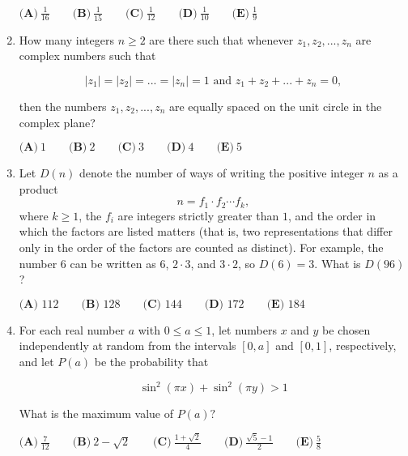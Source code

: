\documentclass{article}
\begin{document}
\begin{enumerate}[label=\arabic*., itemsep=0.5em]
\(\textbf{(A)}\ \frac{1}{16} \qquad\textbf{(B)}\ \frac{1}{15} \qquad\textbf{(C)}\ \frac{1}{12} \qquad\textbf{(D)}\ \frac{1}{10} \qquad\textbf{(E)}\ \frac{1}{9}\)\par \vspace{0.5em}\item How many integers \(n \geq 2\) are there such that whenever \(z_1, z_2, ..., z_n\) are complex numbers such that


\begin{equation*}
|z_1| = |z_2| = ... = |z_n| = 1 \text{    and    } z_1 + z_2 + ... + z_n = 0,
\end{equation*}

then the numbers \(z_1, z_2, ..., z_n\) are equally spaced on the unit circle in the complex plane?

\(\textbf{(A)}\ 1 \qquad\textbf{(B)}\ 2 \qquad\textbf{(C)}\ 3 \qquad\textbf{(D)}\ 4 \qquad\textbf{(E)}\ 5\)\par \vspace{0.5em}\item Let \(D(n)\) denote the number of ways of writing the positive integer \(n\) as a product
\begin{equation*}
n = f_1\cdot f_2\cdots f_k,
\end{equation*}
where \(k\ge1\), the \(f_i\) are integers strictly greater than \(1\), and the order in which the factors are listed matters (that is, two representations that differ only in the order of the factors are counted as distinct). For example, the number \(6\) can be written as \(6\), \(2\cdot 3\), and \(3\cdot2\), so \(D(6) = 3\). What is \(D(96)\)?

\(\textbf{(A) } 112 \qquad\textbf{(B) } 128 \qquad\textbf{(C) } 144 \qquad\textbf{(D) } 172 \qquad\textbf{(E) } 184\)\par \vspace{0.5em}\item For each real number \(a\) with \(0 \leq a \leq 1\), let numbers \(x\) and \(y\) be chosen independently at random from the intervals \([0, a]\) and \([0, 1]\), respectively, and let \(P(a)\) be the probability that


\begin{equation*}
\sin^2{(\pi x)} + \sin^2{(\pi y)} > 1
\end{equation*}

What is the maximum value of \(P(a)?\)

\(\textbf{(A)}\ \frac{7}{12} \qquad\textbf{(B)}\ 2 - \sqrt{2} \qquad\textbf{(C)}\ \frac{1+\sqrt{2}}{4} \qquad\textbf{(D)}\ \frac{\sqrt{5}-1}{2} \qquad\textbf{(E)}\ \frac{5}{8}\)\par \vspace{0.5em}
\end{enumerate}
\end{document}
